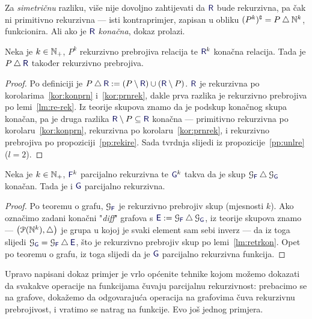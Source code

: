 Za \emph{simetričnu} razliku, više nije dovoljno zahtijevati da $\f R$ bude rekurzivna, pa čak ni primitivno rekurzivna --- isti kontraprimjer, zapisan u obliku $(P^k)\sp{{\scriptscriptstyle\complement}}=P\mathbin\triangle{\mathbb N}^k$, funkcionira. Ali ako je $\f R$ \emph{konačna}, dokaz prolazi.

\begin{lema}[{name=[rekurzivna prebrojivost simetrične razlike s konačnom relacijom]}]\label{lm:retrkon}
Neka je $k\in{\mathbb N}_+$, $P^k$ rekurzivno prebrojiva relacija te $\f R^k$ konačna relacija. Tada je $P\mathbin\triangle\f R$ također rekurzivno prebrojiva.
\end{lema}
\begin{proof}
Po definiciji je $P\mathbin\triangle\f R:=(P\setminus\f R)\cup(\f R\setminus P)$.
    $\f R$ je rekurzivna po korolarima~\ref{kor:konprn} i~\ref{kor:prnrek}, dakle prva razlika je rekurzivno prebrojiva po lemi~\ref{lm:re-rek}. Iz teorije skupova znamo da je podskup konačnog skupa konačan, pa je druga razlika $\f R\setminus P\subseteq\f R$ konačna --- primitivno rekurzivna po korolaru~\ref{kor:konprn}, rekurzivna po korolaru~\ref{kor:prnrek}, i rekurzivno prebrojiva po propoziciji~\ref{pp:rekire}. Sada tvrdnja slijedi iz propozicije~\ref{pp:unlre} ($l=2$). %
\end{proof}

\begin{propozicija}[{name=[teorem o editiranju za parcijalne funkcije]}]
Neka je $k\in{\mathbb N}_+$, $\f F^k$ parcijalno rekurzivna te $\f G^k$ takva da je skup $\graf{\f F}\mathbin\triangle\graf{\f G}$ konačan. Tada je i $\f G$ parcijalno rekurzivna.
\end{propozicija}
\begin{proof}
Po teoremu o grafu, $\graf{\f F}$ je rekurzivno prebrojiv skup (mjesnosti $k$). Ako označimo zadani konačni "\emph{\!diff}" grafova s $\f E:=\graf{\f F}\mathbin\triangle\graf{\f G}$, iz teorije skupova znamo --- $\bigl(\mathcal P({\mathbb N}^k),\mathbin\triangle\bigr)$ je grupa u kojoj je svaki element sam sebi inverz --- da iz toga slijedi $\graf{\f G}=\graf{\f F}\mathbin\triangle\f E$, što je rekurzivno prebrojiv skup po lemi~\ref{lm:retrkon}. Opet po teoremu o grafu, iz toga slijedi da je $\f G$ parcijalno rekurzivna funkcija.
\end{proof}

Upravo napisani dokaz primjer je vrlo općenite tehnike kojom možemo dokazati da svakakve operacije na funkcijama čuvaju parcijalnu rekurzivnost: prebacimo se na grafove, dokažemo da odgovarajuća operacija na grafovima čuva rekurzivnu prebrojivost, i vratimo se natrag na funkcije. Evo još jednog primjera.

